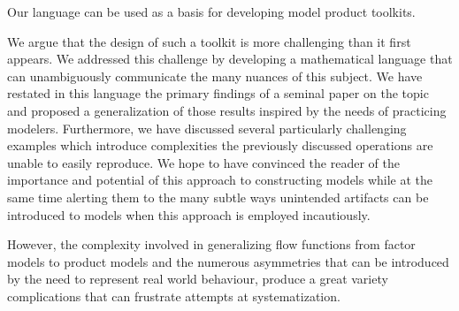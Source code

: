 Our language can be used as a basis for developing model product toolkits.

We argue that the design of such a toolkit is more challenging than it first appears. We addressed this challenge by developing a mathematical language that can unambiguously communicate the many nuances of this subject. We have restated in this language the primary findings of a seminal paper on the topic and proposed a generalization of those results inspired by the needs of practicing modelers. Furthermore, we have discussed several particularly challenging examples which introduce complexities the previously discussed operations are unable to easily reproduce. We hope to have convinced the reader of the importance and potential of this approach to constructing models while at the same time alerting them to the many subtle ways unintended artifacts can be introduced to models when this approach is employed incautiously. 

However, the complexity involved in generalizing flow functions from factor models to product models and the numerous asymmetries that can be introduced by the need to represent real world behaviour, produce a great variety complications that can frustrate attempts at systematization.



